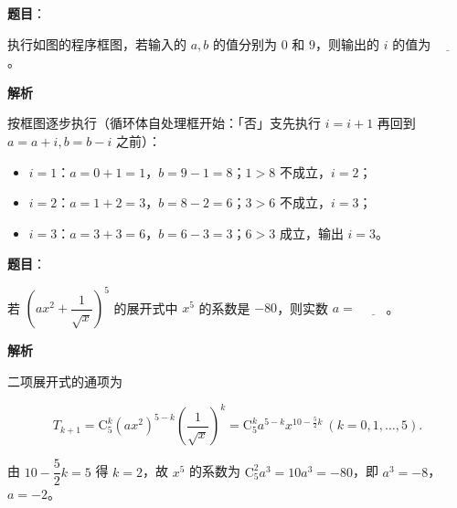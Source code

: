 \begin{answer}

\textbf{题目}：

执行如图的程序框图，若输入的 \(a,b\) 的值分别为 \(0\) 和 \(9\)，则输出的 \(i\) 的值为 \(\underline{\qquad}\)。
\nopagebreak[4]
\begin{center}\end{center}
\nopagebreak[4]
\textbf{解析}

按框图逐步执行（循环体自处理框开始：「否」支先执行 \(i=i+1\) 再回到 \(a=a+i,b=b-i\) 之前）：

\begin{itemize}
\item \(i=1\)：\(a=0+1=1\)，\(b=9-1=8\)；\(1>8\) 不成立，\(i=2\)；
\item \(i=2\)：\(a=1+2=3\)，\(b=8-2=6\)；\(3>6\) 不成立，\(i=3\)；
\item \(i=3\)：\(a=3+3=6\)，\(b=6-3=3\)；\(6>3\) 成立，输出 \(i=3\)。
\end{itemize}


\end{answer}
\begin{answer}

\textbf{题目}：

若 \(\left(ax^{2}+\dfrac{1}{\sqrt{x}}\right)^{5}\) 的展开式中 \(x^{5}\) 的系数是 \(-80\)，则实数 \(a=\) \(\underline{\qquad}\)。

\textbf{解析}

二项展开式的通项为

\nopagebreak[4]
\[
T_{k+1}=\mathrm{C}_{5}^{k}\left(ax^{2}\right)^{5-k}\left(\dfrac{1}{\sqrt{x}}\right)^{k}=\mathrm{C}_{5}^{k}a^{5-k}x^{10-\frac{5}{2}k}\ (k=0,1,\dots,5).
\]

由 \(10-\dfrac{5}{2}k=5\) 得 \(k=2\)，故 \(x^{5}\) 的系数为 \(\mathrm{C}_{5}^{2}a^{3}=10a^{3}=-80\)，即 \(a^{3}=-8\)，\(a=-2\)。


\end{answer}
